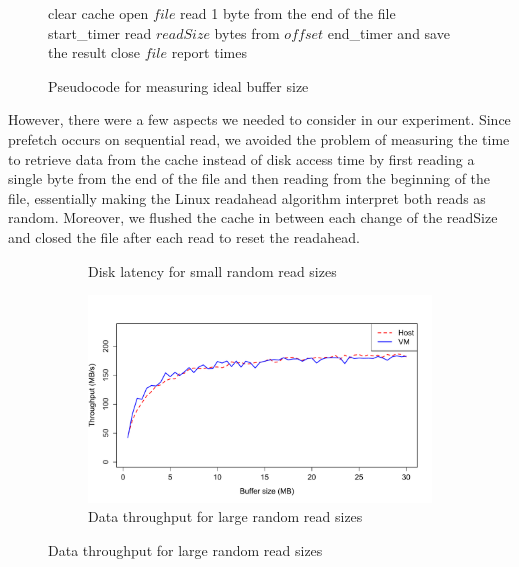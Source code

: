 \begin{figure}[b]
\begin{algorithmic}
   \STATE clear cache
   \STATE open $file$
   \STATE read 1 byte from the end of the file
   \STATE start\_timer
   \STATE read $readSize$ bytes from $offset$
   \STATE end\_timer and save the result
   \STATE close $file$
   \STATE report times
\ENDFOR
\end{algorithmic}
\caption{Pseudocode for measuring ideal buffer size}
\label{fig:p1code}
\end{figure}

However, there were a few aspects we needed to consider in our experiment. 
Since prefetch occurs on sequential read, we avoided the problem of measuring the 
time to retrieve data from the cache instead of disk access time by first reading 
a single byte from the end of the file and then reading from the beginning of the file, 
essentially making the Linux readahead algorithm interpret both reads as random. 
Moreover, we flushed the cache in between each change of the readSize and closed
the file after each read to reset the readahead.

\begin{figure}[t]
	\begin{subfigure}{0.5\textwidth}
	\caption{Disk latency for small random read sizes}
	\label{fig:p1block}
	\end{subfigure}

	\begin{subfigure}{0.5\textwidth}
	\includegraphics[width=\textwidth]{./figures/p1.pdf}
	\caption{Data throughput for large random read sizes}
	\label{fig:p1graph}
	\end{subfigure}
\end{figure}

